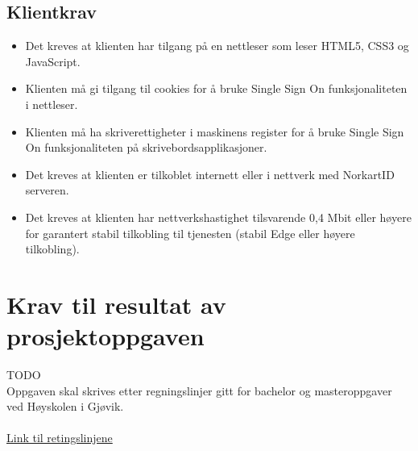 \subsection{Klientkrav}
\label{subsec:kravspesifikasjonGammel_operasjonelleKrav_klientkrav}
\begin{itemize}
\item Det kreves at klienten har tilgang på en nettleser som leser HTML5, CSS3 og JavaScript.
\item Klienten må gi tilgang til cookies for å bruke Single Sign On funksjonaliteten i nettleser.
\item Klienten må ha skriverettigheter i maskinens register for å bruke Single Sign On funksjonaliteten på skrivebordsapplikasjoner.
\item Det kreves at klienten er tilkoblet internett eller i nettverk med NorkartID serveren.
\item Det kreves at klienten har nettverkshastighet tilsvarende 0,4 Mbit eller høyere for garantert stabil tilkobling til tjenesten (stabil Edge eller høyere tilkobling).
\end{itemize}


\section{Krav til resultat av prosjektoppgaven}
\label{sec:kravspesifikasjonGammel_kravTilResultatAvProsjektoppgaven}
{\color{red}TODO}\\
Oppgaven skal skrives etter regningslinjer gitt for bachelor og masteroppgaver ved Høyskolen i Gjøvik.
\\
\\
\href{http://www.hig.no/content/download/30554/364363/file/Retningslinjer%20for%20mastergradsoppgaver%20og%20st%C3%B8rre%20studentoppgaver%20p%C3%A5%20bachelorniv%C3%A5%20ved%20H%C3%B8gskolen%20i%20Gj%C3%B8vik_des2010_v1201.pdf}{Link til retingslinjene}

